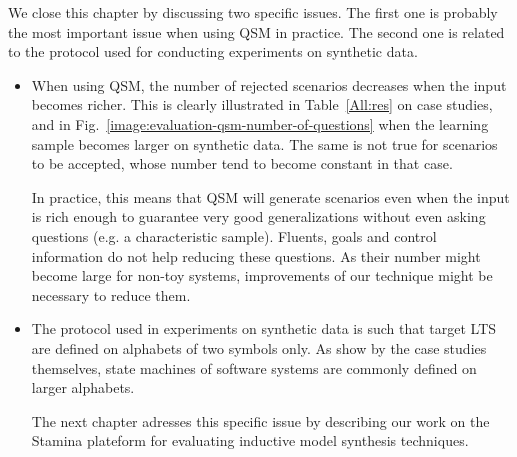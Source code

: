 We close this chapter by discussing two specific issues. The first one is probably the most important issue when using QSM in practice. The second one is related to the protocol used for conducting experiments on synthetic data. 

\begin{itemize}
\item When using QSM, the number of rejected scenarios decreases when the input becomes richer. This is clearly illustrated in Table~\ref{All:res} on case studies, and in Fig.~\ref{image:evaluation-qsm-number-of-questions} when the learning sample becomes larger on synthetic data. The same is not true for scenarios to be accepted, whose number tend to become constant in that case. 

In practice, this means that QSM will generate scenarios even when the input is rich enough to guarantee very good generalizations without even asking questions (e.g. a characteristic sample). Fluents, goals and control information do not help reducing these questions. As their number might become large for non-toy systems, improvements of our technique might be necessary to reduce them.

\item The protocol used in experiments on synthetic data is such that target LTS are defined on alphabets of two symbols only. As show by the case studies themselves, state machines of software systems are commonly defined on larger alphabets. 

The next chapter adresses this specific issue by describing our work on the Stamina plateform for evaluating inductive model synthesis techniques.   
\end{itemize}
